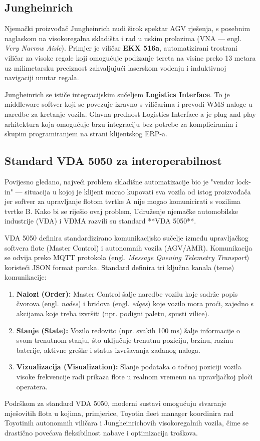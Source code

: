 \documentclass[12pt,a4paper]{article}
\begin{document}
\subsection{Jungheinrich}
Njemački proizvođač Jungheinrich nudi širok spektar AGV rješenja, s posebnim naglaskom na visokoregalna skladišta i rad u uskim prolazima (VNA — engl. \textit{Very Narrow Aisle}). Primjer je viličar \textbf{EKX 516a}, automatizirani trostrani viličar za visoke regale koji omogućuje podizanje tereta na visine preko 13 metara uz milimetarsku preciznost zahvaljujući laserskom vođenju i induktivnoj navigaciji unutar regala.

Jungheinrich se ističe integracijskim sučeljem \textbf{Logistics Interface}. To je middleware softver koji se povezuje izravno s viličarima i prevodi WMS naloge u naredbe za kretanje vozila. Glavna prednost Logistics Interface-a je plug-and-play arhitektura koja omogućuje brzu integraciju bez potrebe za kompliciranim i skupim programiranjem na strani klijentskog ERP-a.

\subsection{Standard VDA 5050 za interoperabilnost}
Povijesno gledano, najveći problem skladišne automatizacije bio je "vendor lock-in" — situacija u kojoj je klijent morao kupovati sva vozila od istog proizvođača jer softver za upravljanje flotom tvrtke A nije mogao komunicirati s vozilima tvrtke B. Kako bi se riješio ovaj problem, Udruženje njemačke automobilske industrije (VDA) i VDMA razvili su standard **VDA 5050**.

VDA 5050 definira standardizirano komunikacijsko sučelje između upravljačkog softvera flote (Master Control) i autonomnih vozila (AGV/AMR). Komunikacija se odvija preko MQTT protokola (engl. \textit{Message Queuing Telemetry Transport}) koristeći JSON format poruka. Standard definira tri ključna kanala (teme) komunikacije:
\begin{enumerate}
    \item \textbf{Nalozi (Order):} Master Control šalje naredbe vozilu koje sadrže popis čvorova (engl. \textit{nodes}) i bridova (engl. \textit{edges}) koje vozilo mora proći, zajedno s akcijama koje treba izvršiti (npr. podigni paletu, spusti vilice).
    \item \textbf{Stanje (State):} Vozilo redovito (npr. svakih 100 ms) šalje informacije o svom trenutnom stanju, što uključuje trenutnu poziciju, brzinu, razinu baterije, aktivne greške i status izvršavanja zadanog naloga.
    \item \textbf{Vizualizacija (Visualization):} Slanje podataka o točnoj poziciji vozila visoke frekvencije radi prikaza flote u realnom vremenu na upravljačkoj ploči operatera.
\end{enumerate}
Podrškom za standard VDA 5050, moderni sustavi omogućuju stvaranje mješovitih flota u kojima, primjerice, Toyotin fleet manager koordinira rad Toyotinih autonomnih viličara i Jungheinrichovih visokoregalnih vozila, čime se drastično povećava fleksibilnost nabave i optimizacija troškova.
\end{document}
